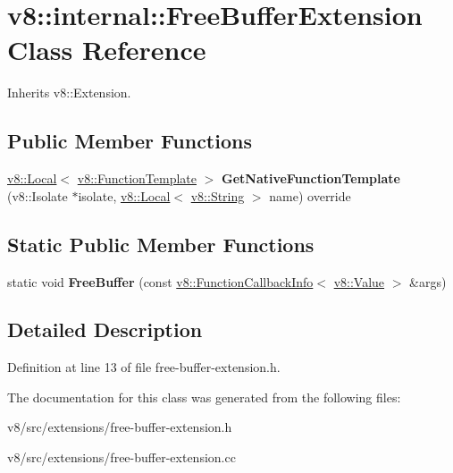 \hypertarget{classv8_1_1internal_1_1FreeBufferExtension}{}\section{v8\+:\+:internal\+:\+:Free\+Buffer\+Extension Class Reference}
\label{classv8_1_1internal_1_1FreeBufferExtension}


Inherits v8\+::\+Extension.

\subsection*{Public Member Functions}
\begin{DoxyCompactItemize}
\item 
\mbox{\label{classv8_1_1internal_1_1FreeBufferExtension_af2bb550784c7ab443b3be90fed9efa1e}} 
\mbox{\hyperlink{classv8_1_1Local}{v8\+::\+Local}}$<$ \mbox{\hyperlink{classv8_1_1FunctionTemplate}{v8\+::\+Function\+Template}} $>$ {\bfseries Get\+Native\+Function\+Template} (v8\+::\+Isolate $\ast$isolate, \mbox{\hyperlink{classv8_1_1Local}{v8\+::\+Local}}$<$ \mbox{\hyperlink{classv8_1_1String}{v8\+::\+String}} $>$ name) override
\end{DoxyCompactItemize}
\subsection*{Static Public Member Functions}
\begin{DoxyCompactItemize}
\item 
\mbox{\label{classv8_1_1internal_1_1FreeBufferExtension_a60bbe3eb396479ad28ad03d14ee93535}} 
static void {\bfseries Free\+Buffer} (const \mbox{\hyperlink{classv8_1_1FunctionCallbackInfo}{v8\+::\+Function\+Callback\+Info}}$<$ \mbox{\hyperlink{classv8_1_1Value}{v8\+::\+Value}} $>$ \&args)
\end{DoxyCompactItemize}


\subsection{Detailed Description}


Definition at line 13 of file free-\/buffer-\/extension.\+h.



The documentation for this class was generated from the following files\+:\begin{DoxyCompactItemize}
\item 
v8/src/extensions/free-\/buffer-\/extension.\+h\item 
v8/src/extensions/free-\/buffer-\/extension.\+cc\end{DoxyCompactItemize}
